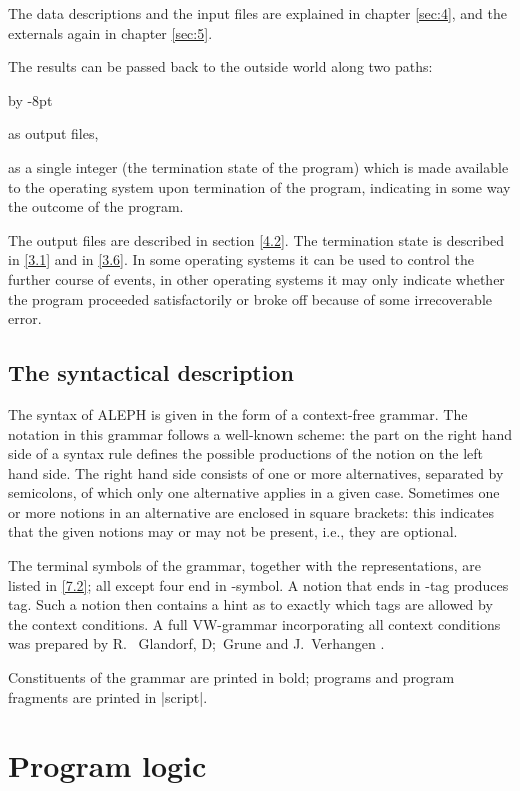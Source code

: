\documentclass{article}
\newcommand\A{{\sf ALEPH}}
\newcommand\g[1]{{\sf #1}}
\renewenvironment{itemize}{\begin{list}{}{%
\advance\leftmargin by -8pt%
\setlength\itemsep{0ex plus 0.2ex}%
\setlength\partopsep{3pt}%
\setlength\topsep{2pt plus 2pt}%
\setlength\parsep{0pt plus 2pt}%
}}{\end{list}}
\begin{document}
The data descriptions and the input files are explained in chapter
\ref{sec:4}, and the
externals again in chapter \ref{sec:5}.

The results can be passed back to the outside world along two paths:
\begin{itemize}
\item[a.] as output files,
\item[b.] as a single integer (the termination state of the program) which is
made available to the operating system upon termination of the program, indicating
in some way the outcome of the program.
\end{itemize}

The output files are described in section \ref{4.2}. The termination state is
described in \ref{3.1} and in \ref{3.6}. In some operating systems it can be used to
control the further course of events, in other operating systems it may only
indicate whether the program proceeded satisfactorily or broke off because
of some irrecoverable error.

\subsection{The syntactical description}\label{2.2}

The syntax of \A{} is given in the form of a context-free grammar. The
notation in this grammar follows a well-known scheme: the part on the right
hand side of a syntax rule defines the possible productions of the notion on
the left hand side. The right hand side consists of one or more
alternatives, separated by semicolons, of which only one alternative applies
in a given case. Sometimes one or more notions in an alternative are
enclosed in square brackets: this indicates that the given notions may or
may not be present, i.e., they are optional.

The terminal symbols of the grammar, together with the representations, are
listed in \ref{7.2}; all except four end in \g{-symbol}. A notion that ends
in \g{-tag} produces \g{tag}. Such a notion then contains a hint as to
exactly which \g{tag}s are allowed by the context conditions. A full
VW-grammar incorporating all context conditions was prepared by R.~
Glandorf, D;~Grune and J.~Verhangen \cite{GGV78}.

Constituents of the grammar are printed in \g{bold}; programs and program
fragments are printed in \pp|script|.

\section{Program logic}\label{sec:3}
\end{document}
